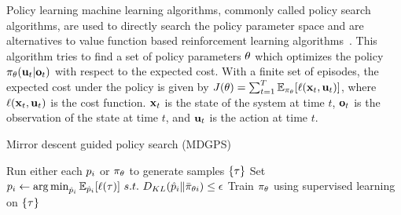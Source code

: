 Policy learning machine learning algorithms, commonly called policy search algorithms, are used to directly search the policy parameter space and are alternatives to value function based reinforcement learning algorithms~\cite{bagnell2003policy}. 
This algorithm tries to find a set of
policy parameters $\theta$ which optimizes the policy
$\pi_{\theta}(\mathbf{u}_t|\mathbf{o}_t)$ with respect to the expected cost. 
With a finite set of episodes, 
the expected cost under the policy is given by
$J(\theta)=\sum_{t=1}^{T}\mathbb{E}_{\pi_{\theta}}[\ell(\mathbf{x}_t,\mathbf{u}_t)]$,
where $\ell(\mathbf{x}_t,\mathbf{u}_t)$ is the cost function. 
$\mathbf{x}_t$ is the state of the
system at time $t$, $\mathbf{o}_t$ is the observation of the state at time $t$,
and $\mathbf{u}_t$ is the action at time $t$.



\setlength{\textfloatsep}{12pt}
\begin{algorithm}[tb]
    \caption{Mirror descent guided policy search (MDGPS)}
    \label{alg:mdgps}
    \begin{algorithmic}[1]
            \STATE Run either each $p_i$ or $\pi_{\theta}$ to
            generate samples $\{\tau\}$
            \STATE Set
            $p_i\leftarrow\operatorname*{arg\,min}_{\hat{p}_i}\mathbb{E}_{\hat{p}_i}[\ell(\tau)]~s.t.~D_{KL}(\hat{p}_i\|\bar{\pi}_{\theta{i}})\leq\epsilon$
            \STATE Train $\pi_{\theta}$ using supervised learning on
            $\{\tau\}$
        \ENDFOR
    \end{algorithmic}
\end{algorithm}

